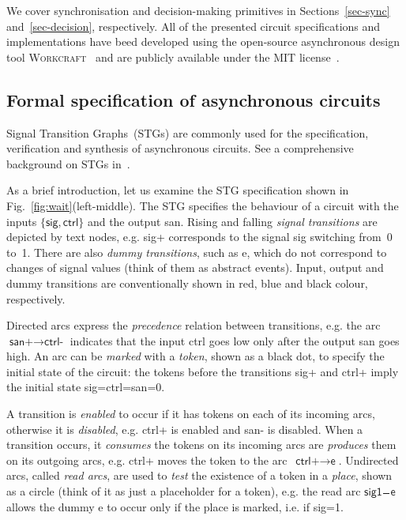 \documentclass[conference]{IEEEtran}
\begin{document}
We cover synchronisation and
decision-making primitives in Sections~\ref{sec-sync} and~\ref{sec-decision}, respectively.
All of the presented circuit specifications and implementations have beed developed using
the open-source asynchronous design tool \textsc{Workcraft}~\cite{Workcraft_website} and are
publicly available under the MIT license~\cite{Arbitration_primitives_github}.


\vspace{0.5mm}
\subsection*{Formal specification of asynchronous circuits}\label{sec-stg}

Signal Transition Graphs~(STGs) are commonly used for the specification,
verification and synthesis of asynchronous circuits. See a comprehensive
background on STGs in~\cite{2002_cortadella_book}.

As a brief introduction, let us examine the STG specification shown in
Fig.~\ref{fig:wait}(left-middle). The STG specifies the behaviour
of a circuit with the inputs $\{\textsf{sig}, \textsf{ctrl}\}$
and the output \textsf{san}. Rising and falling \emph{signal transitions} are depicted by text
nodes, e.g. \textsf{sig+} corresponds to the signal \textsf{sig} switching from~0 to~1.
There are also \emph{dummy transitions}, such as \textsf{e}, which do not correspond to
changes of signal values (think of them as abstract events).
Input, output and dummy transitions are conventionally shown in red, blue and black
colour, respectively.

Directed arcs express the \emph{precedence} relation
between transitions, e.g. the arc $\textsf{san+} \longrightarrow \textsf{ctrl-}$ indicates
that the input \textsf{ctrl} goes low only after the output \textsf{san} goes high.
An arc can be \emph{marked} with a \emph{token}, shown as a black dot, to specify
the initial state of the circuit: the tokens before the transitions \textsf{sig+} and
\textsf{ctrl+} imply the initial state \textsf{sig=ctrl=san=0}.

A transition is \emph{enabled} to occur if it has tokens on each of its incoming
arcs, otherwise it is \emph{disabled}, e.g. \textsf{ctrl+} is enabled and \textsf{san-}
is disabled. When a transition occurs, it \emph{consumes} the tokens on its incoming arcs
are \emph{produces} them on its outgoing arcs, e.g. \textsf{ctrl+} moves the token to the
arc~$\textsf{ctrl+} \longrightarrow \textsf{e}$. Undirected arcs, called
\emph{read arcs}, are used to \emph{test} the existence of a token in a \emph{place}, shown as
a circle (think of it as just a placeholder for a token), e.g. the read arc
$\textsf{sig1} \frac{~~~~}{~} \textsf{e}$ allows the dummy \textsf{e} to occur only if
the place is marked, i.e. if \textsf{sig=1}.
\end{document}
